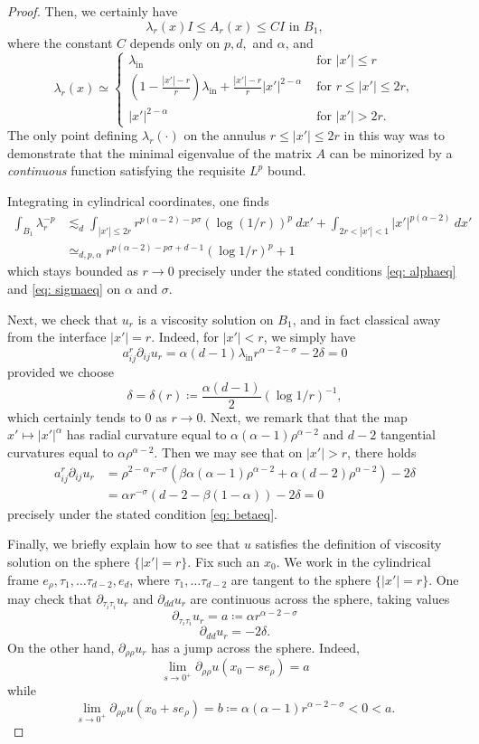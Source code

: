 \documentclass[reqno]{amsart}
\numberwithin{equation}{section}
\numberwithin{equation}{section}
\newcounter{case}
\begin{document}
\begin{proof}
Then, we certainly have
$$\lambda_r(x) I \le A_r(x)\le C I \text{ in } B_1,$$
where the constant $C$ depends only on $p,d,$ and $\alpha$, and
$$\lambda_r(x) \simeq \begin{cases} \lambda_{\text{in}}& \text{ for } |x'| \le r\\
(1-\frac{|x'|-r}{r})\lambda_{\text{in}} + \frac{|x'|-r}{r} |x'|^{2-\alpha} & \text{ for } r\le |x'| \le 2r,\\
|x'|^{2-\alpha} & \text{ for } |x'|>2r.
\end{cases}$$
The only point defining $\lambda_r(\cdot)$ on the annulus $r\le |x'| \le 2r$ in this way was to demonstrate that the minimal eigenvalue of the matrix $A$ can be minorized by a \textit{continuous} function satisfying the requisite $L^p$ bound. 

Integrating in cylindrical coordinates, one finds 
\begin{align} \int_{B_1} \lambda_r^{-p} &\lesssim_d \int_{|x'| \le 2r} r^{p(\alpha-2) - p\sigma}(\log(1/r))^p \ dx' + \int_{2r <|x'| <1} |x'|^{p(\alpha-2)} \ dx'\\
& \simeq_{d,p,\alpha} r^{p(\alpha-2) - p\sigma+ d-1}(\log 1/r)^{p} + 1
\end{align}
which stays bounded as $r\to 0$ precisely under the stated conditions \eqref{eq: alphaeq} and \eqref{eq: sigmaeq} on $\alpha$ and $\sigma$. 

Next, we check that $u_r$ is a viscosity solution on $B_1$, and in fact classical away from the interface $|x'|=r$. Indeed, for $|x'| <  r$, we simply have
$$a_{ij}^r \partial_{ij}u_r = \alpha  (d-1)\lambda_{\text{in}} r^{\alpha-2-\sigma} - 2 \delta=0$$
provided we choose
$$\delta = \delta(r) \coloneqq \frac{\alpha(d-1)}{2} (\log 1/r)^{-1}, $$
which certainly tends to $0$ as $r\to 0$. Next, we remark that that the map $x' \mapsto |x'|^\alpha$ has radial curvature equal to  $\alpha(\alpha -1) \rho^{\alpha-2}$ and $d-2$ tangential curvatures equal to $\alpha \rho^{\alpha-2}$. Then we may see that on $|x'|>r$, there holds
\begin{align} a_{ij}^r \partial_{ij}u_r &= \rho^{2-\alpha}r^{-\sigma}\left(\beta \alpha(\alpha-1) \rho^{\alpha -2} + \alpha(d-2) \rho^{\alpha -2}\right) - 2\delta\\
&= \alpha r^{-\sigma}(d-2 - \beta(1-\alpha)) - 2\delta =0
\end{align}
precisely under the stated condition \eqref{eq: betaeq}.

Finally, we briefly explain how to see that $u$ satisfies the definition of viscosity solution on the sphere $\{|x'|=r\}$. Fix such an $x_0$. We work in the cylindrical frame $e_\rho, \tau_1, \ldots \tau_{d-2}, e_d$, where $\tau_1, \ldots \tau_{d-2}$ are tangent to the sphere $\{|x'|=r\}$. One may check that $\partial_{\tau_i \tau_i} u_r$ and $\partial_{dd}u_r$ are continuous across the sphere, taking values
$$\partial_{\tau_i \tau_i} u_r = a \coloneqq \alpha r^{\alpha -2-\sigma}$$
$$\partial_{dd}u_r = -2\delta.$$
On the other hand, $\partial_{\rho \rho} u_r$ has a jump across the sphere. Indeed, 
$$\lim_{s \to 0^+} \partial_{\rho\rho}u(x_0 - se_\rho) = a$$
while
$$\lim_{s \to 0^+} \partial_{\rho\rho}u(x_0+ se_\rho) = b \coloneqq \alpha(\alpha-1)r^{\alpha-2-\sigma} <0<a.$$


\end{proof}
\end{document}
